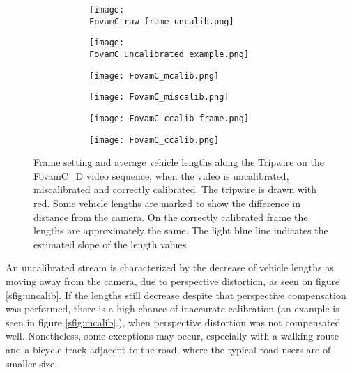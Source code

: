 \begin{figure}[!t]
	\centering
	\begin{subfigure}[b]{\textwidth}
		\centering
		\begin{subfigure}[t]{0.45\textwidth}
		\texttt{[image: FovamC\_raw\_frame\_uncalib.png]}
		\end{subfigure}
	\quad
		\begin{subfigure}[t]{0.375\textwidth}
		\texttt{[image: FovamC\_uncalibrated\_example.png]}
		\end{subfigure}
	\end{subfigure}
	\hfill
	\begin{subfigure}[b]{\textwidth}
		\centering
		\begin{subfigure}[t]{0.45\textwidth}
			\texttt{[image: FovamC\_mcalib.png]}
		\end{subfigure}
		\quad
		\begin{subfigure}[t]{0.375\textwidth}
			\texttt{[image: FovamC\_miscalib.png]}
		\end{subfigure}
	\end{subfigure}
	\hfill
	\begin{subfigure}[b]{\textwidth}
		\centering
		\begin{subfigure}[t]{0.45\textwidth}
			\texttt{[image: FovamC\_ccalib\_frame.png]}
		\end{subfigure}
		\quad
		\begin{subfigure}[t]{0.375\textwidth}
			\texttt{[image: FovamC\_ccalib.png]}
		\end{subfigure}
	\end{subfigure}

	\caption{Frame setting and average vehicle lengths along the Tripwire on the FovamC\_D video sequence, when the video is uncalibrated, miscalibrated and correctly calibrated. The tripwire is drawn with red. Some vehicle lengths are marked to show the difference in distance from the camera. On the correctly calibrated frame the lengths are approximately the same. The light blue line indicates the estimated slope of the length values.\label{fig:calibration_versions}}
\end{figure}

An uncalibrated stream is characterized by the decrease of vehicle lengths as moving away from the camera, due to perspective distortion, as seen on figure \ref{sfig:uncalib}.
If the lengths still decrease despite that perspective compensation was performed, there is a high chance of inaccurate calibration (an example is seen in figure \ref{sfig:mcalib}.), when perspective distortion was not compensated well.
Nonetheless, some exceptions may occur, especially with a walking route and a bicycle track adjacent to the road, where the typical road users are of smaller size.

